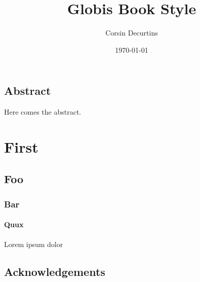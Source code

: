 \documentclass[11pt,a4paper]{globis-book}
\title{Globis Book Style}
\author{Corsin Decurtins}
\institute{Institute of Information Systems}
\date{\today}
\begin{document}
\frontmatter
\maketitlepage
\cleardoublepage
{}

\chapter*{Abstract}

Here comes the abstract.

\tableofcontents

\mainmatter


\part{First}
\chapter{Foo}
\section{Bar}
\subsection{Quux}
Lorem ipsum dolor

\appendix

\listoffigures
\listoftables

\chapter*{Acknowledgements}

\newpage
\thispagestyle{empty}
\end{document}
